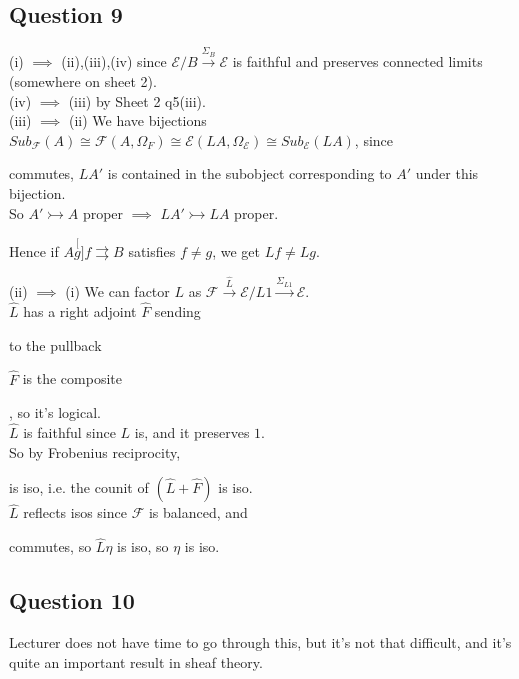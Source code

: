 \documentclass[a4paper]{article}
\begin{document}
\subsection{Question 9}
(i) $\implies$ (ii),(iii),(iv) since $\mathcal{E}/B \xrightarrow{\Sigma_B} \mathcal{E}$ is faithful and preserves connected limits (somewhere on sheet 2).\\
(iv) $\implies$ (iii) by Sheet 2 q5(iii).\\
(iii) $\implies$ (ii) We have bijections $Sub_{\mathcal{F}}(A) \cong \mathcal{F}(A,\Omega_F) \cong \mathcal{E}(LA,\Omega_\mathcal{E}) \cong Sub_\mathcal{E}(LA)$, since 


commutes, $LA'$ is contained in the subobject corresponding to $A'$ under this bijection.\\
So $A' \rightarrowtail A$ proper $\implies$ $LA' \rightarrowtail LA$ proper.

Hence if $A \stackrel[g]{f}{\rightrightarrows} B$ satisfies $f \neq g$, we get $Lf \neq Lg$.

(ii) $\implies$ (i) We can factor $L$ as $\mathcal{F} \xrightarrow{\hat{L}} \mathcal{E}/L1 \xrightarrow{\Sigma_{L1}} \mathcal{E}$.\\
$\hat{L}$ has a right adjoint $\hat{F}$ sending 
to the pullback

$\hat{F}$ is the composite
, so it's logical.\\
$\hat{L}$ is faithful since $L$ is, and it preserves $1$.\\
So by Frobenius reciprocity,

is iso, i.e. the counit of $(\hat{L}+\hat{F})$ is iso.\\
$\hat{L}$ reflects isos since $\mathcal{F}$ is balanced, and 
commutes, so $\hat{L} \eta$ is iso, so $\eta$ is iso.

\subsection{Question 10}
Lecturer does not have time to go through this, but it's not that difficult, and it's quite an important result in sheaf theory.
\end{document}
